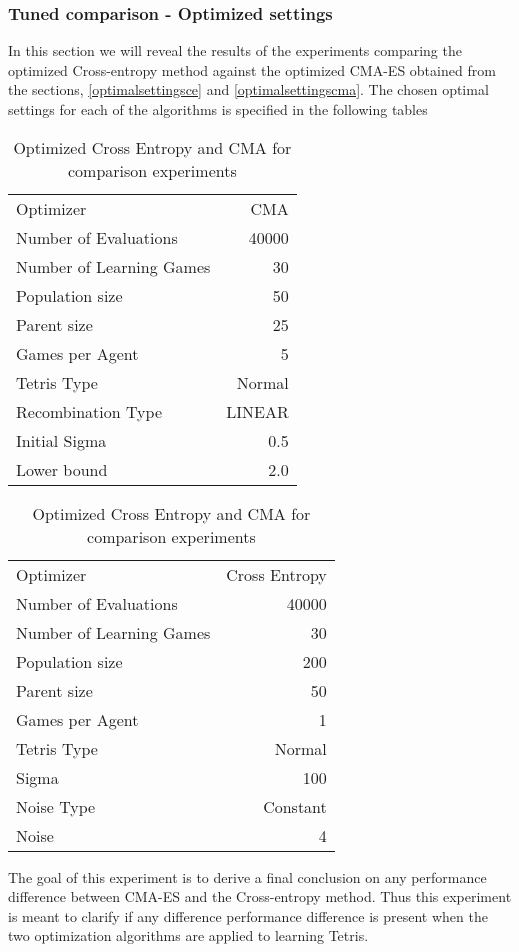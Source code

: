 \subsubsection{Tuned comparison - Optimized settings \label{tunedComparison}}
In this section we will reveal the results of the experiments comparing 
the optimized Cross-entropy method
against the
optimized CMA-ES obtained from the sections, \ref{optimalsettingsce} and \ref{optimalsettingscma}.
The chosen optimal settings for each of the algorithms is specified in the following tables
\begin{table}[H]
\centering
\begin{tabular}{l r}
Optimizer & CMA\\
Number of Evaluations & 40000\\
Number of Learning Games & 30\\
Population size& 50\\
Parent size & 25\\
Games per Agent & 5\\
Tetris Type & Normal\\
\hline
Recombination Type & LINEAR\\
Initial Sigma & 0.5\\
Lower bound & 2.0\\
\end{tabular}
\quad
\begin{tabular}{l r}
Optimizer & Cross Entropy\\
Number of Evaluations & 40000\\
Number of Learning Games & 30\\
Population size & 200\\
Parent size & 50\\
Games per Agent & 1\\
Tetris Type & Normal\\
\hline
Sigma & 100\\
Noise Type & Constant\\
Noise & 4
\end{tabular}
\caption{Optimized Cross Entropy and CMA for comparison experiments}
\end{table}
The goal of this experiment is to derive a final conclusion
on any performance difference between CMA-ES and the Cross-entropy method.
Thus this experiment is meant to clarify if any difference performance difference
is present when the two optimization algorithms are applied to learning Tetris.\\


